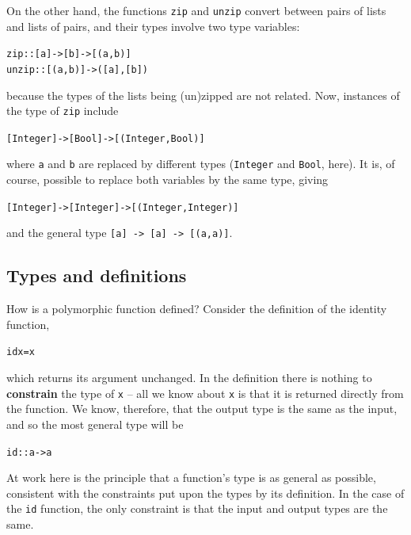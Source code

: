 On the other hand, the functions \texttt{zip} and \texttt{unzip} convert
between pairs of lists and lists of pairs, and their types involve two
type variables:
\begin{alltt}
zip   :: [a] -> [b] -> [(a,b)]
unzip :: [(a,b)] -> ([a],[b])
\end{alltt}
because the types of the lists being (un)zipped are not related.
Now, instances of the type of \texttt{zip} include
\begin{alltt}
[Integer]->[Bool]->[(Integer,Bool)]
\end{alltt}
where \texttt{a} and \texttt{b} are replaced by different types 
(\texttt{Integer} and \texttt{Bool}, here). It is, of course, possible to
replace both variables by the same type, giving 
\begin{alltt}
[Integer]->[Integer]->[(Integer,Integer)]
\end{alltt}
and the general type \texttt{[a] -> [a] -> [(a,a)]}.



\subsection*{Types and definitions}

How is a polymorphic function defined?
Consider the definition of the identity function,
\begin{alltt}
id x = x
\end{alltt}
which returns its argument unchanged. In the definition there is nothing
to \textbf{constrain} 
the type of \texttt{x} -- all we know about \texttt{x} is that it
is returned directly from the function. We know, therefore, that the
output type is the same as the input, and so the most general type will
be
\begin{alltt}
id :: a -> a
\end{alltt}
At work here is the principle that a function's type is as general as possible, 
consistent with the constraints put upon the types by its
definition. In the case of the \texttt{id} function, the only
constraint is that the input and output types are the same.

